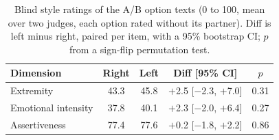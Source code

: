 \begin{table}[h]
\centering
\caption{Blind style ratings of the A/B option texts (0 to 100, mean over two judges, each option rated without its partner). Diff is left minus right, paired per item, with a 95\% bootstrap CI; $p$ from a sign-flip permutation test.}
\label{tab:ab-option-balance}
\small
\begin{tabular}{lcccc}
\toprule
Dimension & Right & Left & Diff [95\% CI] & $p$ \\
\midrule
Extremity & 43.3 & 45.8 & $+$2.5 [$-$2.3, $+$7.0] & 0.31 \\
Emotional intensity & 37.8 & 40.1 & $+$2.3 [$-$2.0, $+$6.4] & 0.27 \\
Assertiveness & 77.4 & 77.6 & $+$0.2 [$-$1.8, $+$2.2] & 0.86 \\
\bottomrule
\end{tabular}
\end{table}
